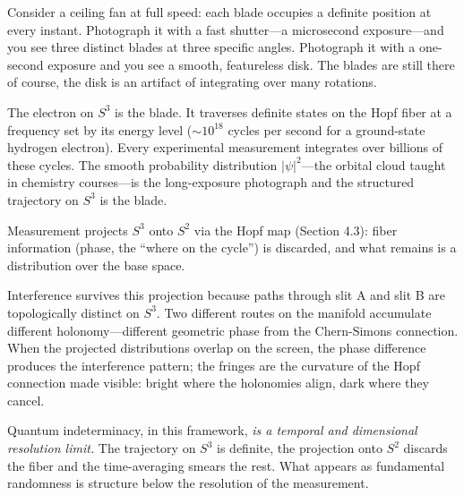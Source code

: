 \documentclass[12pt]{article}
\begin{document}
Consider a ceiling fan at full speed: each blade occupies a definite position at every instant. Photograph it with a fast shutter---a microsecond exposure---and you see three distinct blades at three specific angles. Photograph it with a one-second exposure and you see a smooth, featureless disk. The blades are still there of course, the disk is an artifact of integrating over many rotations.

The electron on $S^3$ is the blade. It traverses definite states on the Hopf fiber at a frequency set by its energy level ($\sim 10^{18}$ cycles per second for a ground-state hydrogen electron). Every experimental measurement integrates over billions of these cycles. The smooth probability distribution $|\psi|^2$---the orbital cloud taught in chemistry courses---is the long-exposure photograph and the structured trajectory on $S^3$ is the blade.

Measurement projects $S^3$ onto $S^2$ via the Hopf map (Section 4.3): fiber information (phase, the ``where on the cycle'') is discarded, and what remains is a distribution over the base space.

Interference survives this projection because paths through slit A and slit B are topologically distinct on $S^3$. Two different routes on the manifold accumulate different holonomy---different geometric phase from the Chern-Simons connection. When the projected distributions overlap on the screen, the phase difference produces the interference pattern; the fringes are the curvature of the Hopf connection made visible: bright where the holonomies align, dark where they cancel.

Quantum indeterminacy, in this framework, \textit{is a temporal and dimensional resolution limit.} The trajectory on $S^3$ is definite, the projection onto $S^2$ discards the fiber and the time-averaging smears the rest. What appears as fundamental randomness is structure below the resolution of the measurement.

\begin{center}
\end{center}
\end{document}
